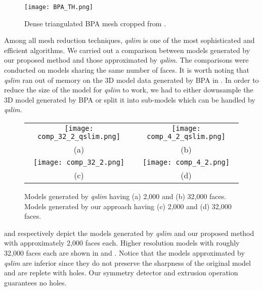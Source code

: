 \begin{figure}[htbp]
\begin{center}
\texttt{[image: BPA\_TH.png]}
\end{center}
\caption{Dense triangulated BPA mesh cropped from .}
\label{fig:TH_BPA}
\end{figure}

Among all mesh reduction techniques, {\it qslim} is one of the most
sophisticated and efficient algorithms.
We carried out a comparison between models generated by our proposed
method and those approximated by {\it qslim}.
The comparisons were conducted on models sharing the same number of faces.
It is worth noting that {\it qslim} ran out of memory on the 3D model data
generated by BPA in .
In order to reduce the size of the model for {\it qslim} to work, we had
to either downsample the 3D model generated by BPA or split it into
sub-models which can be handled by {\it qslim}.

\begin{figure}[htbp]
\begin{center}
\begin{tabular}{cc}
\texttt{[image: comp\_32\_2\_qslim.png]} &
\texttt{[image: comp\_4\_2\_qslim.png]} \\
(a) & (b) \\
\texttt{[image: comp\_32\_2.png]} &
\texttt{[image: comp\_4\_2.png]} \\
(c) & (d)
\end{tabular}
\end{center}
\caption{
Models generated by {\it qslim} having (a) 2,000 and (b) 32,000 faces.
Models generated by our approach having (c) 2,000 and (d) 32,000 faces.}
\label{fig:TH_comp}
\end{figure}

 and  respectively depict the models generated
by {\it qslim} and our proposed method with approximately 2,000 faces each.
Higher resolution models with roughly 32,000 faces each are shown in
 and .
Notice that the models approximated by {\it qslim} are inferior since they
do not preserve the sharpness of the original model and are replete with
holes. Our symmetry detector and extrusion operation guarantees no holes.

